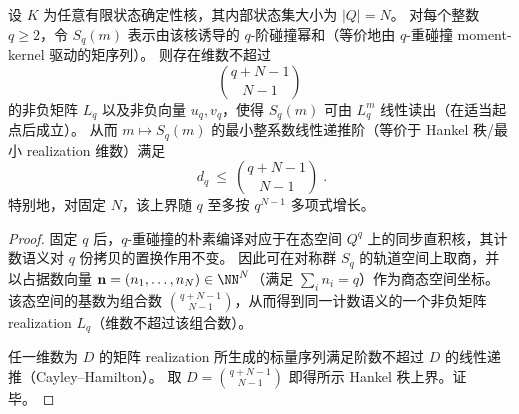 \begin{theorem}\label{thm:pom-sympower-hankel-polynomial-upper-bound}
设 \(K\) 为任意有限状态确定性核，其内部状态集大小为 \(|Q|=N\)。
对每个整数 \(q\ge 2\)，令 \(S_q(m)\) 表示由该核诱导的 \(q\)-阶碰撞幂和（等价地由 \(q\)-重碰撞 moment-kernel 驱动的矩序列）。
则存在维数不超过
\[
\binom{q+N-1}{N-1}
\]
的非负矩阵 \(L_q\) 以及非负向量 \(u_q,v_q\)，使得 \(S_q(m)\) 可由 \(L_q^m\) 线性读出（在适当起点后成立）。
从而 \(m\mapsto S_q(m)\) 的最小整系数线性递推阶（等价于 Hankel 秩/最小 realization 维数）满足
\[
\boxed{\;
d_q\ \le\ \binom{q+N-1}{N-1}\; }.
\]
特别地，对固定 \(N\)，该上界随 \(q\) 至多按 \(q^{N-1}\) 多项式增长。
\end{theorem}

\begin{proof}
固定 \(q\) 后，\(q\)-重碰撞的朴素编译对应于在态空间 \(Q^q\) 上的同步直积核，其计数语义对 \(q\) 份拷贝的置换作用不变。
因此可在对称群 \(S_q\) 的轨道空间上取商，并以占据数向量 \(\mathbf n=(n_1,\dots,n_N)\in\NN^N\)（满足 \(\sum_i n_i=q\)）作为商态空间坐标。
该态空间的基数为组合数 \(\binom{q+N-1}{N-1}\)，从而得到同一计数语义的一个非负矩阵 realization \(L_q\)（维数不超过该组合数）。
\par
任一维数为 \(D\) 的矩阵 realization 所生成的标量序列满足阶数不超过 \(D\) 的线性递推（Cayley--Hamilton）。
取 \(D=\binom{q+N-1}{N-1}\) 即得所示 Hankel 秩上界。证毕。
\end{proof}



